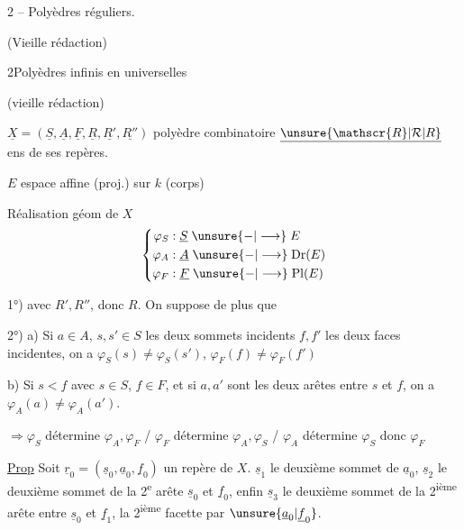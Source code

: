 2 -- Polyèdres réguliers.

(Vieille rédaction)


2\unsure{-|=}Polyèdres infinis en  universelles

(vieille rédaction)

$\underline{X}=(\underline{S},\underline{A},\underline{F},\underline{R},\underline{R'},\underline{R''})$ polyèdre combinatoire $\underline{\unsure{\mathscr{R}|\mathcal{R}|R}}$ ens de ses repères.

$E$ espace affine (proj.) sur $k$ (corps)

Réalisation géom de $X$
\[
\left\{\begin{aligned}
\varphi_S &: \underline{S}\mathrel{\unsure{-|\longrightarrow}}E\\
\varphi_A &: \underline{A}\mathrel{\unsure{-|\longrightarrow}}\mathrm{Dr}(E)\\
\varphi_F &: \underline{F}\mathrel{\unsure{-|\longrightarrow}}\mathrm{Pl}(E)
\end{aligned}\right.
\]

1°)  avec $R',R''$, donc $R$. On suppose de plus que

2°) a) Si $a\in A$, $s,s'\in S$ les deux sommets incidents $f,f'$ les deux faces incidentes, on a $\varphi_S(s)\ne\varphi_S(s')$, $\varphi_F(f)\ne\varphi_F(f')$

b) Si $s<f$ avec $s\in S$, $f\in F$, et si $a,a'$ sont les deux arêtes entre $s$ et $f$, on a $\varphi_A(a)\ne\varphi_A(a')$.

$\Rightarrow\varphi_S$ détermine $\varphi_A,\varphi_F$ /  $\varphi_F$ détermine $\varphi_A,\varphi_S$ / $\varphi_A$ détermine $\varphi_S$ donc $\varphi_F$


\uline{Prop} Soit $\underline{r}_0=(\underline{s}_0,\underline{a}_0,\underline{f}_0)$ un repère de $X$.  $\underline{s}_1$ le deuxième sommet de $\underline{a}_0$, $\underline{s}_2$ le deuxième sommet de la 2\textsuperscript{e} arête   $\underline{s}_0$ et $\underline{f}_0$, enfin $\underline{s}_3$ le deuxième sommet de la 2\textsuperscript{ième} arête  entre $\underline{s}_0$ et $\underline{f}_1$, la 2\textsuperscript{ième} facette  par $\unsure{\underline{a}_0|\underline{f}_0}$.

